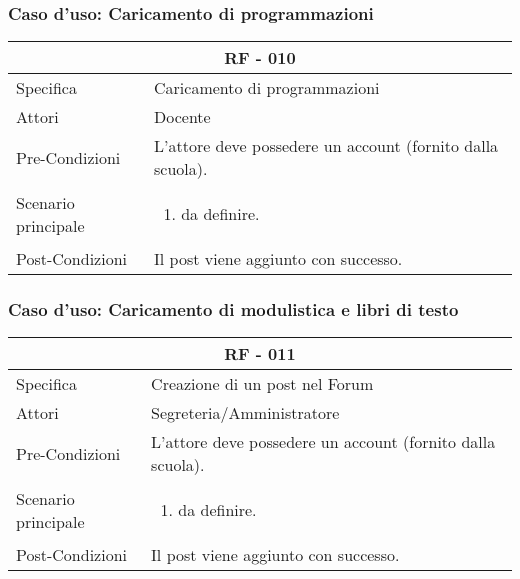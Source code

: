 \documentclass{article}
\begin{document}
\subsubsection{\textbf{Caso d'uso: Caricamento di programmazioni}}
\begin{tabular}{ |p{3cm}|p{9cm}|  }
	\hline
	\multicolumn{2}{|c|}{\textbf{RF - 010}} \\
	\hline
	Specifica& Caricamento di programmazioni\\
	\hline
	Attori& Docente\\
	\hline
	Pre-Condizioni& L'attore deve possedere un account (fornito dalla scuola).\\
	\hline
	Scenario principale& \begin{enumerate}
		\item da definire.
	\end{enumerate}\\
	\hline
	Post-Condizioni& Il post viene aggiunto con successo.\\
	\hline
\end{tabular}
\subsubsection{\textbf{Caso d'uso: Caricamento di modulistica e libri di testo}}
\begin{tabular}{ |p{3cm}|p{9cm}|  }
	\hline
	\multicolumn{2}{|c|}{\textbf{RF - 011}} \\
	\hline
	Specifica& Creazione di un post nel Forum\\
	\hline
	Attori& Segreteria/Amministratore\\
	\hline
	Pre-Condizioni& L'attore deve possedere un account (fornito dalla scuola).\\
	\hline
	Scenario principale& \begin{enumerate}
		\item da definire.
	\end{enumerate}\\
	\hline
	Post-Condizioni& Il post viene aggiunto con successo.\\
	\hline
\end{tabular}
\normalsize
\flushleft
\vspace{4mm} 
\end{document}
